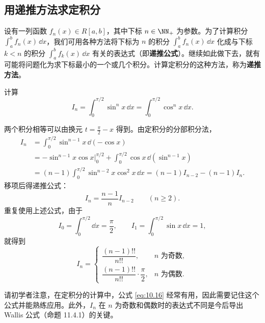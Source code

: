 \subsection{用递推方法求定积分}

设有一列函数 $f_n(x)\in R[a,b]$，其中下标 $n\in\NN_+$ 为参数。为了计算积分 $\int_a^b f_n(x)\,\dd x$，我们可用各种方法将下标为 $n$ 的积分 $\int_a^b f_n(x)\,\dd x$ 化成与下标 $k<n$ 的积分 $\int_a^b f_k(x)\,\dd x$ 有关的表达式（即\textbf{递推公式}）。继续如此做下去，就有可能将问题化为求下标最小的一个或几个积分。计算定积分的这种方法，称为\textbf{递推方法}。

\begin{xexample}[10.4.9]
计算
\[
  I_n=\int_0^{\pi/2}\sin^n x\,\dd x=\int_0^{\pi/2}\cos^n x\,\dd x.
\]
\end{xexample}
\begin{xsolution}
两个积分相等可以由换元 $t=\frac\pi2-x$ 得到。由定积分的分部积分法，
\begin{align*}
  I_n&=\int_0^{\pi/2}\sin^{n-1}x\,\dd(-\cos x)\\
  &=-\sin^{n-1}x\cos x\Big|_0^{\pi/2}
    +\int_0^{\pi/2}\cos x\,\dd(\sin^{n-1}x)\\
  &=(n-1)\int_0^{\pi/2}\sin^{n-2}x\cos^2x\,\dd x
   =(n-1)I_{n-2}-(n-1)I_n.
\end{align*}
移项后得递推公式：
\[
  I_n=\frac{n-1}{n}I_{n-2}\qquad(n\geqslant2).
\]
重复使用上述公式，由于
\[
  I_0=\int_0^{\pi/2}\dd x=\frac\pi2,
  \qquad
  I_1=\int_0^{\pi/2}\sin x\,\dd x=1,
\]
就得到
\begin{equation}
  I_n=
  \begin{cases}
    \dfrac{(n-1)!!}{n!!},&n\text{ 为奇数},\\[6pt]
    \dfrac{(n-1)!!}{n!!}\cdot\dfrac\pi2,&n\text{ 为偶数}.
  \end{cases}
  \tag{10.16}
  \label{eq:10.16}
\end{equation}
\end{xsolution}

\begin{xremark}
请初学者注意，在定积分的计算中，公式 \eqref{eq:10.16} 经常有用，因此需要记住这个公式并能熟练应用。此外，$I_n$ 在 $n$ 为奇数和偶数时的表达式不同是今后导出 Wallis 公式（命题 11.4.1）的关键。
\end{xremark}

